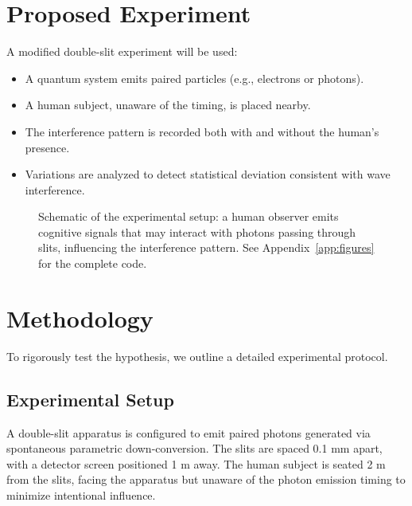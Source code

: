 \documentclass[12pt]{IEEEtran}
\begin{document}
\section{Proposed Experiment}
A modified double-slit experiment will be used:
\begin{itemize}
    \item A quantum system emits paired particles (e.g., electrons or photons).
    \item A human subject, unaware of the timing, is placed nearby.
    \item The interference pattern is recorded both with and without the human's presence.
    \item Variations are analyzed to detect statistical deviation consistent with wave interference.
\end{itemize}

\begin{figure}[!t]
\centering
{}
\caption{Schematic of the experimental setup: a human observer emits cognitive signals that may interact with photons passing through slits, influencing the interference pattern. See Appendix~\ref{app:figures} for the complete code.}
\label{fig:setup}
\end{figure}

\section{Methodology}
To rigorously test the hypothesis, we outline a detailed experimental protocol.

\subsection{Experimental Setup}
A double-slit apparatus is configured to emit paired photons generated via spontaneous parametric down-conversion. The slits are spaced 0.1 mm apart, with a detector screen positioned 1 m away. The human subject is seated 2 m from the slits, facing the apparatus but unaware of the photon emission timing to minimize intentional influence.
\end{document}
